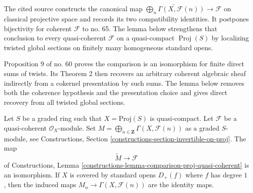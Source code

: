 \begin{lemma}
\label{lemma-proj-quasi-coherent}
\begin{reference}
\cite[Chapter III, \S 2, no. 59, definition of $\beta$ and
Propositions 7 and 8, p. 252]{FAC}
\cite[Chapter III, \S 2, no. 60, Proposition 9 and Theorem 2,
pp. 252--253]{FAC}
\end{reference}
\begin{history}
The cited source constructs the canonical map
$\widetilde{\bigoplus_n\Gamma(X,\mathcal{F}(n))}\to\mathcal{F}$ on
classical projective space and records its two compatibility identities.
It postpones bijectivity for coherent $\mathcal{F}$ to no. 65. The lemma
below strengthens that conclusion to every quasi-coherent
$\mathcal{F}$ on a quasi-compact $\operatorname{Proj}(S)$ by localizing
twisted global sections on finitely many homogeneous standard opens.

Proposition 9 of no. 60 proves the comparison is an isomorphism for finite
direct sums of twists. Its Theorem 2 then recovers an arbitrary coherent
algebraic sheaf indirectly from a cokernel presentation by such sums. The
lemma below removes both the coherence hypothesis and the presentation
choice and gives direct recovery from all twisted global sections.
\end{history}
Let $S$ be a graded ring such that $X = \text{Proj}(S)$ is quasi-compact.
Let $\mathcal{F}$ be a quasi-coherent $\mathcal{O}_X$-module. Set
$M = \bigoplus_{n \in \mathbf{Z}} \Gamma(X, \mathcal{F}(n))$ as
a graded $S$-module, see
Constructions, Section \ref{constructions-section-invertible-on-proj}.
The map
$$
\widetilde{M} \longrightarrow \mathcal{F}
$$
of Constructions, Lemma
\ref{constructions-lemma-comparison-proj-quasi-coherent}
is an isomorphism.
If $X$ is covered by standard opens $D_+(f)$ where $f$ has degree $1$,
then the induced maps
$M_n \to \Gamma(X, \mathcal{F}(n))$ are the identity maps.
\end{lemma}

